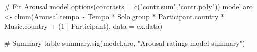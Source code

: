 \documentclass[
  bookmarksnumbered]{article}
\newenvironment{Shaded}{\begin{snugshade}}{\end{snugshade}}
\newcommand{\AttributeTok}[1]{\textcolor[rgb]{0.80,0.80,0.80}{#1}}
\newcommand{\CommentTok}[1]{\textcolor[rgb]{0.50,0.62,0.50}{#1}}
\newcommand{\DecValTok}[1]{\textcolor[rgb]{0.86,0.86,0.80}{#1}}
\newcommand{\FunctionTok}[1]{\textcolor[rgb]{0.94,0.94,0.56}{#1}}
\newcommand{\NormalTok}[1]{\textcolor[rgb]{0.80,0.80,0.80}{#1}}
\newcommand{\OtherTok}[1]{\textcolor[rgb]{0.94,0.94,0.56}{#1}}
\newcommand{\SpecialCharTok}[1]{\textcolor[rgb]{0.86,0.64,0.64}{#1}}
\newcommand{\StringTok}[1]{\textcolor[rgb]{0.80,0.58,0.58}{#1}}
\begin{document}
\begin{Shaded}
\begin{Highlighting}[]
\CommentTok{\# Fit Arousal model}
\FunctionTok{options}\NormalTok{(}\AttributeTok{contrasts =} \FunctionTok{c}\NormalTok{(}\StringTok{"contr.sum"}\NormalTok{,}\StringTok{"contr.poly"}\NormalTok{))}
\NormalTok{model.aro }\OtherTok{\textless{}{-}} \FunctionTok{clmm}\NormalTok{(Arousal.tempo }\SpecialCharTok{\textasciitilde{}}\NormalTok{ Tempo }\SpecialCharTok{*}\NormalTok{ Solo.group }\SpecialCharTok{*}\NormalTok{ Participant.country }\SpecialCharTok{*}\NormalTok{ Music.country }\SpecialCharTok{+} 
\NormalTok{                    (}\DecValTok{1} \SpecialCharTok{|}\NormalTok{ Participant),}
                  \AttributeTok{data =}\NormalTok{ ex.data)}

\CommentTok{\# Summary table}
\FunctionTok{summary.sig}\NormalTok{(model.aro, }\StringTok{"Arousal ratings model summary"}\NormalTok{)}
\end{Highlighting}
\end{Shaded}
\end{document}
